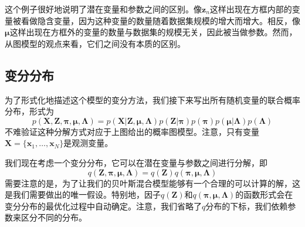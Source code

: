这个例子很好地说明了潜在变量和参数之间的区别。像$\boldsymbol{z}_n$这样出现在方框内部的变量被看做隐含变量，因为这种变量的数量随着数据集规模的增大而增大。相反，像$\boldsymbol{\mu}$这样出现在方框外的变量的数量与数据集的规模无关，因此被当做参数。然而，从图模型的观点来看，它们之间没有本质的区别。
\subsection*{变分分布}
为了形式化地描述这个模型的变分方法，我们接下来写出所有随机变量的联合概率分布，形式为
\begin{equation}
\label{gan}
	p(\boldsymbol{X},\boldsymbol{Z},\boldsymbol{\pi},\boldsymbol{\mu},\boldsymbol{\Lambda})=p(\boldsymbol{X}|\boldsymbol{Z},\boldsymbol{\mu},\boldsymbol{\Lambda})p(\boldsymbol{Z}|\boldsymbol{\pi})p(\boldsymbol{\pi})p(\boldsymbol{\mu}|\boldsymbol{\Lambda})p(\boldsymbol{\Lambda})
\end{equation}
不难验证这种分解方式对应于上图给出的概率图模型。注意，只有变量$\boldsymbol{X}=\{\boldsymbol{x}_1,\dots,\boldsymbol{x}_N\}$是观测变量。

我们现在考虑一个变分分布，它可以在潜在变量与参数之间进行分解，即
\begin{equation}
\label{anwei}
	q(\boldsymbol{Z},\boldsymbol{\pi},\boldsymbol{\mu},\boldsymbol{\Lambda})=q(\boldsymbol{Z})q(\boldsymbol{\pi},\boldsymbol{\mu},\boldsymbol{\Lambda})
\end{equation}
需要注意的是，为了让我们的贝叶斯混合模型能够有一个合理的可以计算的解，这是我们需要做出的唯一假设。特别地，因子$q(\boldsymbol{Z})$和$q(\boldsymbol{\pi},\boldsymbol{\mu},\boldsymbol{\Lambda})$的函数形式会在变分分布的最优化过程中自动确定。注意，我们省略了$q$分布的下标，我们依赖参数来区分不同的分布。

